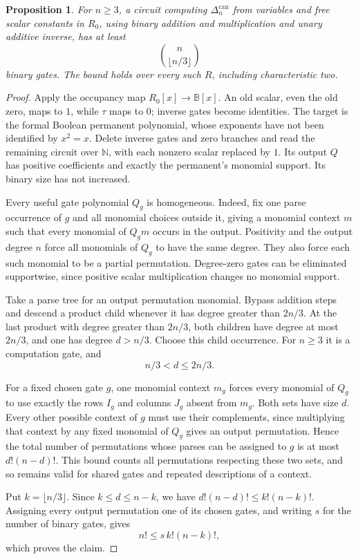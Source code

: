 \documentclass[11pt]{article}
\newcommand{\B}{\mathbb B}
\newcommand{\N}{\mathbb N}
\newtheorem{proposition}[theorem]{Proposition}
\theoremstyle{definition}
\theoremstyle{remark}
\begin{document}
\begin{proposition}\label{prop:canonicaldet}
For $n\ge3$, a circuit computing $\Delta_n^{\mathrm{can}}$ from variables and free scalar constants in $R_0$, using binary addition and multiplication and unary additive inverse, has at least
\[
 \binom{n}{\lfloor n/3\rfloor}
\]
binary gates. The bound holds over every such $R$, including characteristic two.
\end{proposition}
\begin{proof}
Apply the occupancy map $R_0[x]\to\B[x]$. An old scalar, even the old zero, maps to $1$, while $\tau$ maps to $0$; inverse gates become identities. The target is the formal Boolean permanent polynomial, whose exponents have not been identified by $x^2=x$. Delete inverse gates and zero branches and read the remaining circuit over $\N$, with each nonzero scalar replaced by $1$. Its output $Q$ has positive coefficients and exactly the permanent's monomial support. Its binary size has not increased.

Every useful gate polynomial $Q_g$ is homogeneous. Indeed, fix one parse occurrence of $g$ and all monomial choices outside it, giving a monomial context $m$ such that every monomial of $Q_gm$ occurs in the output. Positivity and the output degree $n$ force all monomials of $Q_g$ to have the same degree. They also force each such monomial to be a partial permutation. Degree-zero gates can be eliminated supportwise, since positive scalar multiplication changes no monomial support.

Take a parse tree for an output permutation monomial. Bypass addition steps and descend a product child whenever it has degree greater than $2n/3$. At the last product with degree greater than $2n/3$, both children have degree at most $2n/3$, and one has degree $d>n/3$. Choose this child occurrence. For $n\ge3$ it is a computation gate, and
\[
 n/3<d\le2n/3.
\]

For a fixed chosen gate $g$, one monomial context $m_g$ forces every monomial of $Q_g$ to use exactly the rows $I_g$ and columns $J_g$ absent from $m_g$. Both sets have size $d$. Every other possible context of $g$ must use their complements, since multiplying that context by any fixed monomial of $Q_g$ gives an output permutation. Hence the total number of permutations whose parses can be assigned to $g$ is at most $d!(n-d)!$. This bound counts all permutations respecting these two sets, and so remains valid for shared gates and repeated descriptions of a context.

Put $k=\lfloor n/3\rfloor$. Since $k\le d\le n-k$, we have $d!(n-d)!\le k!(n-k)!$. Assigning every output permutation one of its chosen gates, and writing $s$ for the number of binary gates, gives
\[
 n!\le s\,k!(n-k)!,
\]
which proves the claim.
\end{proof}
\end{document}
